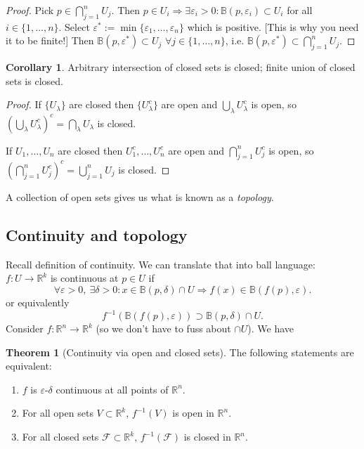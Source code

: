 \documentclass[a4paper]{article}
\theoremstyle{definition}
\newtheorem{thm}[defn]{Theorem}
\newtheorem{coro}[defn]{Corollary}
\begin{document}
\begin{proof}
Pick $p\in \displaystyle \bigcap_{j=1}^n U_j$. Then $p\in U_i \Rightarrow \exists \varepsilon_i>0 : \mathbb B (p,\varepsilon_i) \subset U_i$ for all $i\in \{1,\ldots,n\}$. Select $\varepsilon^\ast :=\min \{\varepsilon_1,\ldots,\varepsilon_n\}$ which is positive. [This is why you need it to be finite!] Then $\mathbb B (p,\varepsilon^\ast) \subset U_j$ $\forall j\in\{1,\ldots,n\}$, i.e. $\mathbb B (p,\varepsilon^\ast) \subset \displaystyle \bigcap_{j=1}^n U_j$.
\end{proof}
\begin{coro}
Arbitrary intersection of closed sets is closed; finite union of closed sets is closed.
\end{coro}
\begin{proof}
If $\{U_\lambda\}$ are closed then $\{U_\lambda^c\}$ are open and $\displaystyle \bigcup_{\lambda} U_\lambda^c$ is open, so $\displaystyle \left(\bigcup_\lambda U_\lambda^c \right)^c = \bigcap_{\lambda} U_\lambda$ is closed.

If $U_1,\ldots,U_n$ are closed then $U_1^c,\ldots,U_n^c$ are open and $\displaystyle \bigcap_{j=1}^n U_j^c$ is open, so $\displaystyle \left( \bigcap_{j=1}^n U_j^c \right)^c = \bigcup_{j=1}^n U_j$ is closed.
\end{proof}
A collection of open sets gives us what is known as a \textit{topology}.

\subsection{Continuity and topology}
Recall definition of continuity. We can translate that into ball language: $f:U\rightarrow \mathbb R^k$ is continuous at $p\in U$ if
\[
\forall \varepsilon >0, \ \exists \delta >0 : x\in \mathbb B(p,\delta ) \cap U \Rightarrow f(x)\in \mathbb B (f(p),\varepsilon ) .
\]
or equivalently
\[
f^{-1}(\mathbb B (f(p),\varepsilon))\supset \mathbb B(p,\delta) \cap U .
\]
Consider $f:\mathbb R^n \rightarrow \mathbb R^k$ (so we don't have to fuss about $\cap U$). We have
\begin{thm}[Continuity via open and closed sets]
The following statements are equivalent:\begin{enumerate}
    \item $f$ is $\varepsilon$-$\delta$ continuous at all points of $\mathbb R^n$.
    \item For all open sets $V\subset \mathbb R^k$, $f^{-1}(V)$ is open in $\mathbb R^n$.
    \item For all closed sets $\mathcal F\subset \mathbb R^k$, $f^{-1}(\mathcal F)$ is closed in $\mathbb R^n$.
\end{enumerate}
\end{thm}
\end{document}
